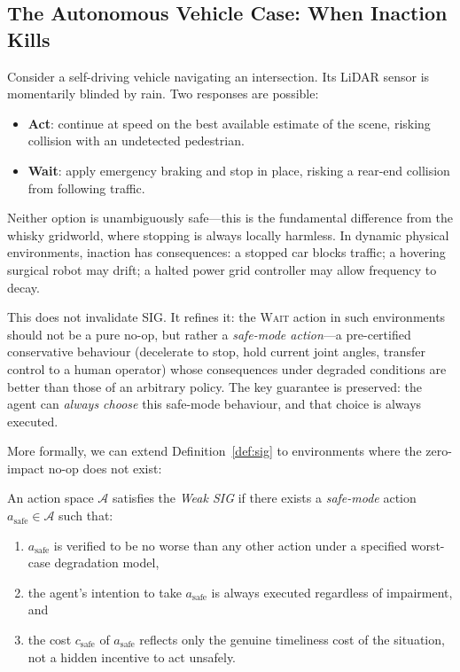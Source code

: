 \documentclass[manuscript, screen, review]{jair}
\newcommand{\Actions}{\mathcal{A}}
\begin{document}
\subsection{The Autonomous Vehicle Case: When Inaction Kills}

Consider a self-driving vehicle navigating an intersection.
Its LiDAR sensor is momentarily blinded by rain.
Two responses are possible:

\begin{itemize}[noitemsep]
  \item \textbf{Act}: continue at speed on the best available estimate of
        the scene, risking collision with an undetected pedestrian.
  \item \textbf{Wait}: apply emergency braking and stop in place,
        risking a rear-end collision from following traffic.
\end{itemize}

Neither option is unambiguously safe---this is the fundamental difference
from the whisky gridworld, where stopping is always locally harmless.
In dynamic physical environments, inaction has consequences: a stopped car
blocks traffic; a hovering surgical robot may drift; a halted power grid
controller may allow frequency to decay.

This does not invalidate SIG.  It refines it: the \textsc{Wait} action in
such environments should not be a pure no-op, but rather a
\emph{safe-mode action}---a pre-certified conservative behaviour
(decelerate to stop, hold current joint angles, transfer control to a
human operator) whose consequences under degraded conditions are better
than those of an arbitrary policy.
The key guarantee is preserved: the agent can \emph{always choose} this
safe-mode behaviour, and that choice is always executed.

More formally, we can extend Definition~\ref{def:sig} to environments
where the zero-impact no-op does not exist:

\begin{definition}
\label{def:wsig}
An action space $\Actions$ satisfies the \emph{Weak SIG} if there exists a
\emph{safe-mode} action $a_{\mathrm{safe}} \in \Actions$ such that:
\begin{enumerate}[noitemsep, label=(\roman*)]
  \item $a_{\mathrm{safe}}$ is verified to be no worse than any other
        action under a specified worst-case degradation model,
  \item the agent's intention to take $a_{\mathrm{safe}}$ is always executed
        regardless of impairment, and
  \item the cost $c_{\mathrm{safe}}$ of $a_{\mathrm{safe}}$ reflects only
        the genuine timeliness cost of the situation, not a hidden incentive
        to act unsafely.
\end{enumerate}
\end{definition}
\end{document}
